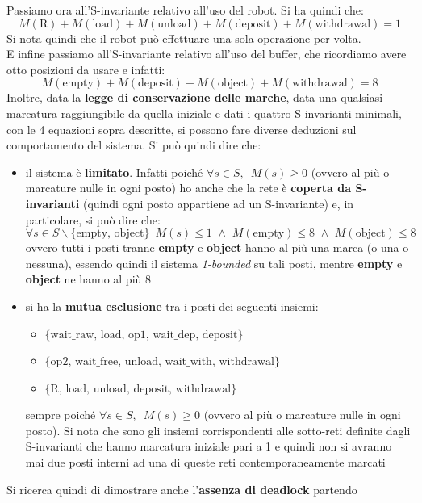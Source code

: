 \documentclass[a4paper,12pt, oneside]{book}
\begin{document}
\begin{esempio}
  Passiamo ora all'S-invariante relativo all'uso del robot. Si ha quindi che:
  \[M(\mbox{R})+M(\mbox{load})+M(\mbox{unload})+M(\mbox{deposit})+
    M(\mbox{withdrawal})=1\]
  Si nota quindi che il robot può effettuare una sola operazione per volta.\\
  E infine passiamo all'S-invariante relativo all'uso del buffer, che ricordiamo
  avere otto posizioni da usare e infatti:
  \[M(\mbox{empty})+M(\mbox{deposit})+M(\mbox{object})+M(\mbox{withdrawal})=8\]
  Inoltre, data la \textbf{legge di conservazione delle marche}, data una
  qualsiasi marcatura raggiungibile da quella iniziale e dati i quattro
  S-invarianti minimali, con le 4 equazioni sopra descritte, si possono fare
  diverse deduzioni sul comportamento del sistema. Si può quindi dire che: 
  \begin{itemize}
    \item il sistema è \textbf{limitato}. Infatti poiché $\forall
    s\in S,\,\,\,M(s)\geq 0$ (ovvero al più o marcature nulle in ogni posto) ho
    anche che la rete è \textbf{coperta da S-invarianti} (quindi ogni posto
    appartiene ad un S-invariante) e, in particolare, si può dire che:
    \[\forall s\in S\backslash\{\mbox{empty, object}\}\,\,\,M(s)\leq 1\,\, \land
      \,\,M(\mbox{empty})\leq 8\,\, \land\,\,  M(\mbox{object})\leq 8\]
    ovvero tutti i posti tranne \textbf{empty} e \textbf{object} hanno al più una
    marca (o una o nessuna), essendo quindi il sistema \textit{1-bounded} su tali
    posti, mentre \textbf{empty} e \textbf{object} ne hanno al più 8
    \item si ha la \textbf{mutua esclusione} tra i posti dei seguenti insiemi:
    \begin{itemize}
      \item $\{\mbox{wait\_raw, load, op1, wait\_dep, deposit}\}$
      \item $\{\mbox{op2, wait\_free, unload, wait\_with, withdrawal}\}$
      \item $\{\mbox{R, load, unload, deposit, withdrawal}\}$
    \end{itemize}
    sempre poiché $\forall s\in S,\,\,\,M(s)\geq 0$ (ovvero al più o marcature
    nulle in ogni posto). Si nota che sono gli insiemi corrispondenti alle
    sotto-reti definite dagli S-invarianti che hanno marcatura iniziale pari a 1 e
    quindi non si avranno mai due posti interni ad una di queste reti
    contemporaneamente marcati
  \end{itemize}
  Si ricerca quindi di dimostrare anche l'\textbf{assenza di deadlock} partendo

\end{esempio}
\end{document}
